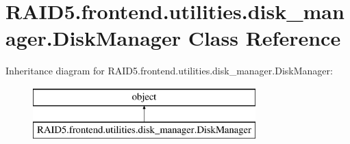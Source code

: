 \hypertarget{class_r_a_i_d5_1_1frontend_1_1utilities_1_1disk__manager_1_1_disk_manager}{}\section{R\+A\+I\+D5.\+frontend.\+utilities.\+disk\+\_\+manager.\+Disk\+Manager Class Reference}
\label{class_r_a_i_d5_1_1frontend_1_1utilities_1_1disk__manager_1_1_disk_manager}
Inheritance diagram for R\+A\+I\+D5.\+frontend.\+utilities.\+disk\+\_\+manager.\+Disk\+Manager\+:\begin{figure}[H]
\begin{center}
\leavevmode
\includegraphics[height=2.000000cm]{class_r_a_i_d5_1_1frontend_1_1utilities_1_1disk__manager_1_1_disk_manager}
\end{center}
\end{figure}
